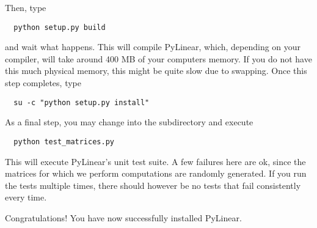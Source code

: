 Then, type
\begin{verbatim}
  python setup.py build
\end{verbatim}
and wait what happens. This will compile PyLinear, which, depending on
your compiler, will take around 400 MB of your computers memory. If you
do not have this much physical memory, this might be quite slow due to
swapping. Once this step completes, type
\begin{verbatim}
  su -c "python setup.py install"
\end{verbatim}

As a final step, you may change into the  subdirectory
and execute
\begin{verbatim}
  python test_matrices.py
\end{verbatim}
This will execute PyLinear's unit test suite. A few failures here
are ok, since the matrices for which we perform computations are
randomly generated. If you run the tests multiple times, there
should however be no tests that fail consistently every time.

Congratulations! You have now successfully installed PyLinear.
